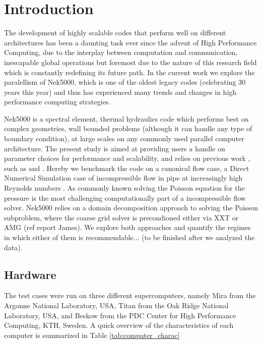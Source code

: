 \documentclass{sig-alternate}
\begin{document}
%
%

%
%
\printccsdesc



\section{Introduction}
The development of highly scalable codes that perform well on different architectures has been a daunting task ever since the advent of High Performance Computing, due to the interplay between computation and communication, inescapable global operations but foremost due to the nature of this research field which is constantly redefining its future path. In the current work we explore the paralellism of Nek5000, which is one of the oldest legacy codes (celebrating 30 years this year) and thus has experienced many trends and changes in high performance computing strategies.

Nek5000 is a spectral element, thermal hydraulics code which performs best on complex geometries, wall bounded problems (although it can handle any type of boundary condition), at large scales on any commonly used parallel computer architecture. The present study is aimed at providing users a handle on parameter choices for performance and scalability, and relies on previous work , such as \cite{fischer:scaling} and \cite{tufo:terascale}. Hereby we benchmark the code on a canonical flow case, a Direct Numerical Simulation case of incompressible flow in pipe at increasingly high Reynolds numbers \cite{Khoury2013}. As commonly known solving the Poisson equation for the pressure is the most challenging computationally part of a incompressible flow solver. Nek5000 relies on a domain decomposition approach to solving the Poisson subproblem, where the coarse grid solver is precondioned either via XXT \cite{Tufo2001151} or AMG (ref report James). We explore both approaches and quantify the regimes in which either of them is recommendable... (to be finished after we analyzed the data).

\subsection{Hardware}

The test cases were run on three different supercomputers, namely Mira from the Argonne National Laboratory, USA, Titan from the Oak Ridge National Laboratory, USA, and Beskow from the PDC Center for High Performance Computing, KTH, Sweden. A quick overview of the characteristics of each computer is summarized in Table \ref{tab:computer_charac}
\end{document}
